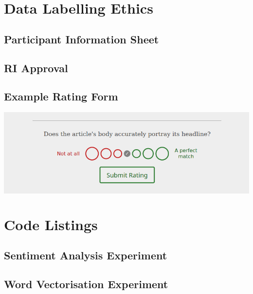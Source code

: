 \documentclass[12pt,a4paper]{article}
\begin{document}
\begin{appendices}
\section{Data Labelling Ethics}


\begin{subappendices}
\subsection{Participant Information Sheet} \label{app:ethics-participant-info}


\subsection{RI Approval} \label{app:ethics-approval}






\subsection{Example Rating Form} \label{app:rating-form}
\includegraphics[scale=0.5]{../docs/ethics/example_rating-just-form}
\end{subappendices}

\section{Code Listings}
\begin{subappendices}
\subsection{Sentiment Analysis Experiment} \label{app:sentiment-analysis}


\subsection{Word Vectorisation Experiment} \label{app:vectorisation}

\end{subappendices}

\end{appendices}
\end{document}
